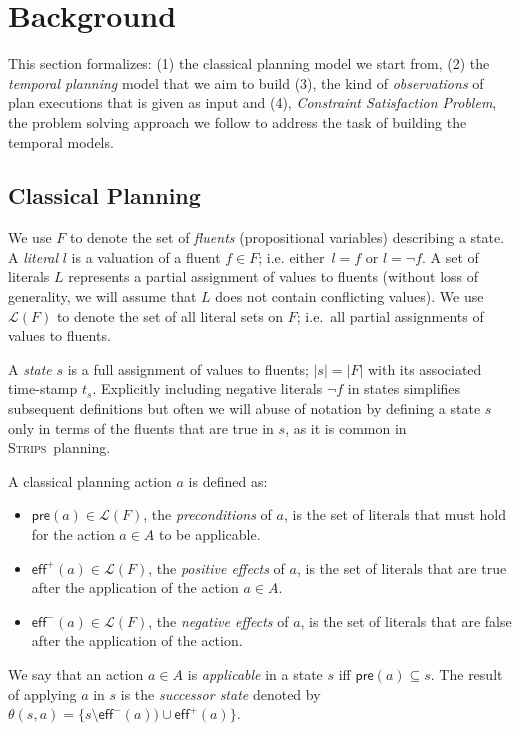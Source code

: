 \documentclass[letterpaper]{article} %
\newcommand{\pre}{\mathsf{pre}}     %
\newcommand{\eff}{\mathsf{eff}}     %
\newcommand{\strips}{\textsc{Strips}}     %
\begin{document}
\section{Background}
\label{sec:background}
This section formalizes: (1) the classical planning model we start from, (2) the {\em temporal planning} model that we aim to build (3), the kind of {\em observations} of plan executions that is given as input and (4), {\em Constraint Satisfaction Problem}, the problem solving approach we follow to address the task of building the temporal models.

\subsection{Classical Planning}
We use $F$ to denote the set of {\em fluents} (propositional variables) describing a state. A {\em literal} $l$ is a valuation of a fluent $f\in F$; i.e. either~$l=f$ or $l=\neg f$. A set of literals $L$ represents a partial assignment of values to fluents (without loss of generality, we will assume that $L$ does not contain conflicting values). We use $\mathcal{L}(F)$ to denote the set of all literal sets on $F$; i.e.~all partial assignments of values to fluents.

A {\em state} $s$ is a full assignment of values to fluents; $|s|=|F|$ with its associated time-stamp $t_s$. Explicitly including negative literals $\neg f$ in states simplifies subsequent definitions but often we will abuse of notation by defining a state $s$ only in terms of the fluents that are true in $s$, as it is common in \strips\ planning.

A classical planning action $a$ is defined as:
\begin{itemize}
\item $\pre(a)\in\mathcal{L}(F)$, the {\em preconditions} of $a$, is the set of literals that must hold for the action $a\in A$ to be applicable.
\item $\eff^+(a)\in\mathcal{L}(F)$, the {\em positive effects} of $a$, is the set of literals that are true after the application of the action $a\in A$.
\item $\eff^-(a)\in\mathcal{L}(F)$, the {\em negative effects} of $a$, is the set of literals that are false after the application of the action.
\end{itemize}
We say that an action $a\in A$ is {\em applicable} in a state $s$ iff $\pre(a)\subseteq s$. The result of applying $a$ in $s$ is the {\em successor state} denoted by $\theta(s,a)=\{s\setminus\eff^-(a))\cup\eff^+(a)\}$.
\end{document}
